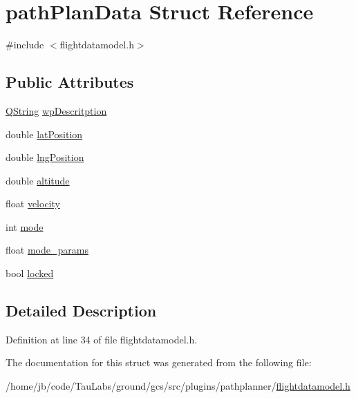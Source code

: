 \hypertarget{structpath_plan_data}{\section{path\-Plan\-Data \-Struct \-Reference}
\label{structpath_plan_data}
}


{\ttfamily \#include $<$flightdatamodel.\-h$>$}

\subsection*{\-Public \-Attributes}
\begin{DoxyCompactItemize}
\item 
\hyperlink{group___u_a_v_objects_plugin_gab9d252f49c333c94a72f97ce3105a32d}{\-Q\-String} \hyperlink{group___path_gac7fc0b526eac540aa404e9d3d6ee95ef}{wp\-Descritption}
\item 
double \hyperlink{group___path_ga741da9e938717a4dba1a1b28afc94d07}{lat\-Position}
\item 
double \hyperlink{group___path_ga28464ee2b2537b0bc670193bc29627b7}{lng\-Position}
\item 
double \hyperlink{group___path_ga6684fc7c8c169232f70b43e4fedc6eb0}{altitude}
\item 
float \hyperlink{group___path_ga58910b1bf08e8e02291db4ea420cc383}{velocity}
\item 
int \hyperlink{group___path_gabea436564f0d9df2abf6b4c35d505753}{mode}
\item 
float \hyperlink{group___path_gaba12f55aa813b5f1dc707e3c1814ab14}{mode\-\_\-params}
\item 
bool \hyperlink{group___path_ga5e07c3e8bda93b1d5dba9dd3d35c0280}{locked}
\end{DoxyCompactItemize}


\subsection{\-Detailed \-Description}


\-Definition at line 34 of file flightdatamodel.\-h.



\-The documentation for this struct was generated from the following file\-:\begin{DoxyCompactItemize}
\item 
/home/jb/code/\-Tau\-Labs/ground/gcs/src/plugins/pathplanner/\hyperlink{flightdatamodel_8h}{flightdatamodel.\-h}\end{DoxyCompactItemize}
